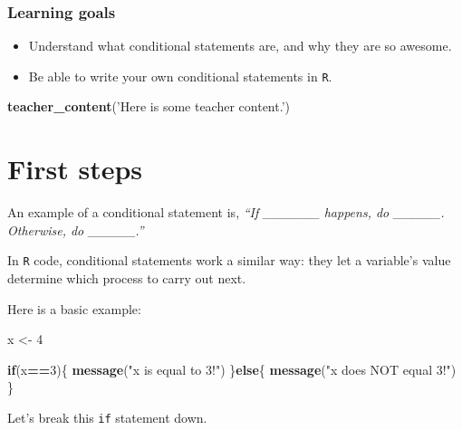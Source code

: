 \documentclass[]{book}
\newenvironment{Shaded}{\begin{snugshade}}{\end{snugshade}}
\newcommand{\ControlFlowTok}[1]{\textcolor[rgb]{0.13,0.29,0.53}{\textbf{#1}}}
\newcommand{\DecValTok}[1]{\textcolor[rgb]{0.00,0.00,0.81}{#1}}
\newcommand{\KeywordTok}[1]{\textcolor[rgb]{0.13,0.29,0.53}{\textbf{#1}}}
\newcommand{\NormalTok}[1]{#1}
\newcommand{\OperatorTok}[1]{\textcolor[rgb]{0.81,0.36,0.00}{\textbf{#1}}}
\newcommand{\StringTok}[1]{\textcolor[rgb]{0.31,0.60,0.02}{#1}}
\providecommand{\tightlist}{%
  \setlength{\itemsep}{0pt}\setlength{\parskip}{0pt}}
\begin{document}
\hypertarget{learning-goals-33}{%
\subsubsection*{Learning goals}\label{learning-goals-33}}

\begin{itemize}
\tightlist
\item
  Understand what conditional statements are, and why they are so awesome.
\item
  Be able to write your own conditional statements in \texttt{R}.
\end{itemize}

\begin{Shaded}
\begin{Highlighting}[]
\KeywordTok{teacher_content}\NormalTok{(}\StringTok{'Here is some teacher content.'}\NormalTok{)}
\end{Highlighting}
\end{Shaded}

\hypertarget{first-steps-1}{%
\section*{First steps}\label{first-steps-1}}

An example of a conditional statement is, \emph{``If \_\_\_\_\_\_ happens, do \_\_\_\_\_. Otherwise, do \_\_\_\_\_.''}

In \texttt{R} code, conditional statements work a similar way: they let a variable's value determine which process to carry out next.

Here is a basic example:

\begin{Shaded}
\begin{Highlighting}[]
\NormalTok{x <-}\StringTok{ }\DecValTok{4}

\ControlFlowTok{if}\NormalTok{(x}\OperatorTok{==}\DecValTok{3}\NormalTok{)\{}
  \KeywordTok{message}\NormalTok{(}\StringTok{"x is equal to 3!"}\NormalTok{)}
\NormalTok{\}}\ControlFlowTok{else}\NormalTok{\{}
  \KeywordTok{message}\NormalTok{(}\StringTok{"x does NOT equal 3!"}\NormalTok{)}
\NormalTok{\}}
\end{Highlighting}
\end{Shaded}

Let's break this \texttt{if} statement down.
\end{document}
